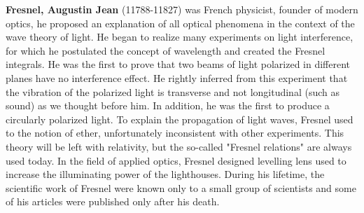 \textbf{Fresnel, Augustin Jean} (11788-11827) was French physicist, founder of modern optics, he proposed an explanation of all optical phenomena in the context of the wave theory of light. He began to realize many experiments on light interference, for which he postulated the concept of wavelength and created the Fresnel integrals. He was the first to prove that two beams of light polarized in different planes have no interference effect. He rightly inferred from this experiment that the vibration of the polarized light is transverse and not longitudinal (such as sound) as we thought before him. In addition, he was the first to produce a circularly polarized light. To explain the propagation of light waves, Fresnel used to the notion of ether, unfortunately inconsistent with other experiments. This theory will be left with relativity, but the so-called "Fresnel relations" are always used today. In the field of applied optics, Fresnel designed levelling lens used to increase the illuminating power of the lighthouses. During his lifetime, the scientific work of Fresnel were known only to a small group of scientists and some of his articles were published only after his death.

